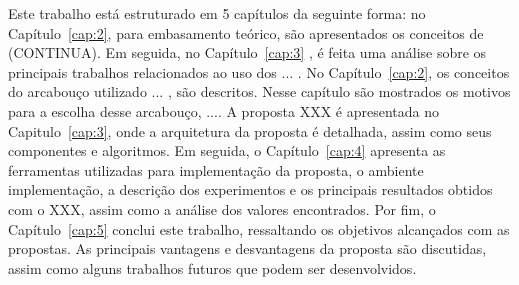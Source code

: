 Este trabalho está estruturado em 5 capítulos da seguinte forma: no Capítulo~\ref{cap:2}, para embasamento teórico, são apresentados os conceitos de (CONTINUA). Em seguida, no Capítulo~\ref{cap:3} , é feita uma análise sobre os principais trabalhos relacionados ao uso dos ... . No Capítulo~\ref{cap:2}, os conceitos do arcabouço utilizado ... , são descritos. Nesse capítulo são mostrados os motivos para a escolha desse arcabouço, .... A proposta XXX é apresentada no Capitulo~\ref{cap:3}, onde a arquitetura da proposta é detalhada, assim como seus componentes e algoritmos. Em seguida, o Capítulo~\ref{cap:4} apresenta as ferramentas utilizadas para implementação da proposta, o ambiente implementação, a descrição dos experimentos e os principais resultados obtidos com o XXX, assim como a análise dos valores encontrados. Por fim, o Capítulo~\ref{cap:5} conclui este trabalho, ressaltando os objetivos alcançados com as propostas. As principais vantagens e desvantagens da proposta são discutidas, assim como alguns trabalhos futuros que podem ser desenvolvidos. 
